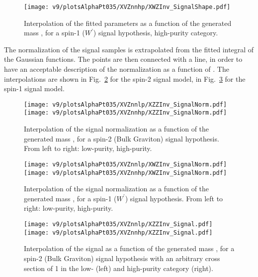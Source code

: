\begin{figure}[!htb]
  \centering
    \texttt{[image: v9/plotsAlphaPt035/XVZnnhp/XWZInv\_SignalShape.pdf]}

  \caption{Interpolation of the fitted parameters as a function of the generated mass \mtVZ, for a spin-1 ($W^{'}$) signal hypothesis, high-purity category.}
  \label{fig:XWZ_SignalShapeHP}
\end{figure}


The normalization of the signal samples is extrapolated from the fitted integral of the Gaussian functions. The points are then connected with a line, in order to have an acceptable description of the normalization as a function of \mtVZ.
The interpolations are shown in Fig.~\ref{fig:XZZ_SignalNorm} for the spin-2 signal model, in Fig.~\ref{fig:XWZ_SignalNorm} for the spin-1 signal model.%

\begin{figure}[!htb]
  \centering
    \texttt{[image: v9/plotsAlphaPt035/XVZnnlp/XZZInv\_SignalNorm.pdf]}
    \texttt{[image: v9/plotsAlphaPt035/XVZnnhp/XZZInv\_SignalNorm.pdf]}
  \caption{Interpolation of the signal normalization as a function of the generated mass \mtVZ, for a spin-2 (Bulk Graviton) signal hypothesis. From left to right: low-purity, high-purity.}
  \label{fig:XZZ_SignalNorm}
\end{figure}

\begin{figure}[!htb]
  \centering
    \texttt{[image: v9/plotsAlphaPt035/XVZnnlp/XWZInv\_SignalNorm.pdf]}
    \texttt{[image: v9/plotsAlphaPt035/XVZnnhp/XWZInv\_SignalNorm.pdf]}
  \caption{Interpolation of the signal normalization as a function of the generated mass \mtVZ, for a spin-1 ($W^{'}$) signal hypothesis. From left to right: low-purity, high-purity.}
  \label{fig:XWZ_SignalNorm}
\end{figure}

\begin{figure}[!htb]
  \centering
    \texttt{[image: v9/plotsAlphaPt035/XVZnnlp/XZZInv\_Signal.pdf]}
    \texttt{[image: v9/plotsAlphaPt035/XVZnnhp/XZZInv\_Signal.pdf]}
  \caption{Interpolation of the signal as a function of the generated mass \mtVZ, for a spin-2 (Bulk Graviton) signal hypothesis with an arbitrary cross section of 1 \pb in the low- (left) and high-purity category (right).}
  \label{fig:XZZInv_Signal}
\end{figure}

